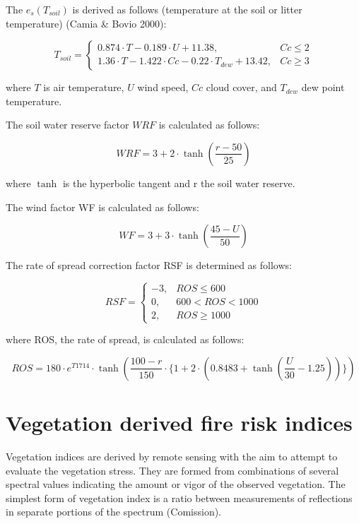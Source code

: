 {{{	The  $e_{s}(T_{soil})$  is derived as follows (temperature at the soil or litter temperature) (Camia \& Bovio 2000):
	
	\begin{equation}
	T_{soil}= \left\{
	\begin{array}{lr}
	 0.874 \cdot T -  0.189 \cdot U + 11.38, & Cc \leq 2 \\
	 1.36 \cdot T - 1.422 \cdot Cc - 0.22 \cdot T_{dew} + 13.42, & Cc \geq 3
	\end{array} 
	\right.
	\end{equation}
	
	
	where $T$ is air temperature, $U$ wind speed, $Cc$ cloud cover, and $T_{dew}$ dew point temperature.
	
	The soil water reserve factor $WRF$ is calculated as follows:
	
	\begin{equation}
	WRF =  3 + 2 \cdot \tanh(\frac{r - 50}{25})
	\end{equation}
	
	where $\tanh$ is the hyperbolic tangent and r the soil water reserve. 
	
	The wind factor WF is calculated as follows:
	
	\begin{equation}
	WF = 3 + 3 \cdot \tanh(\frac{45 - U}{50})
	\end{equation}
	
	The rate of spread correction factor RSF is determined as follows:
	
	\begin{equation}
	RSF= \left\{
	\begin{array}{lr}
	-3,  & ROS \leq 600 \\
	0,  &  600 < ROS < 1000 \\
	2, & ROS \geq 1000
	\end{array} 
	\right.
	\end{equation}
	
	where ROS, the rate of spread, is calculated as follows:
	
	\begin{equation}
	ROS =  180 \cdot e^{T 1714} \cdot  \tanh(\frac{100 - r}{150} \cdot \{1 + 2 \cdot  (0.8483 + \tanh(\frac{U}{30} - 1.25))\})
	\end{equation}

\section{Vegetation derived fire risk indices}
	Vegetation indices are derived by remote sensing with the aim to attempt to evaluate the vegetation
	stress. They are formed from combinations of several spectral values indicating the amount or vigor of the observed vegetation. The simplest form of vegetation index is a ratio between measurements of reflections in separate portions of the spectrum (Comission).
	
}}}
